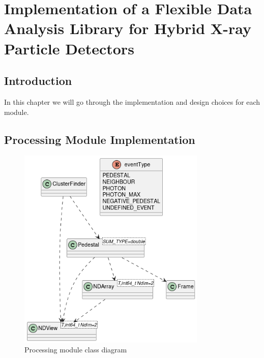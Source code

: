 
\setcounter{chapter}{2}
\chapter{Implementation of a Flexible Data Analysis Library for Hybrid X-ray Particle Detectors }
\minitoc %
\graphicspath{{Chapitre3/figures/}}

\pagestyle{fancy}
\fancyhf{}
\fancyhead[R]{\bfseries\rightmark}
\fancyfoot[R]{\thepage}
\renewcommand{\headrulewidth}{0.5pt}
\renewcommand{\footrulewidth}{0pt}
\renewcommand{\chaptermark}[1]{\markboth{{\chaptername~\thechapter. #1 }}{}}
\renewcommand{\sectionmark}[1]{\markright{\thechapter.\thesection~ #1}}

\begin{spacing}{1.2}

    \section*{Introduction}
    In this chapter we will go through the implementation and design choices for each module.


    

    \section{Processing Module Implementation}
    \begin{figure}
        \centering
        \includegraphics[width=0.8\textwidth]{Chapitre3/figures/processing_class.png}
        \caption{Processing module class diagram}
        \label{fig:processing}
    \end{figure}


\end{spacing}
